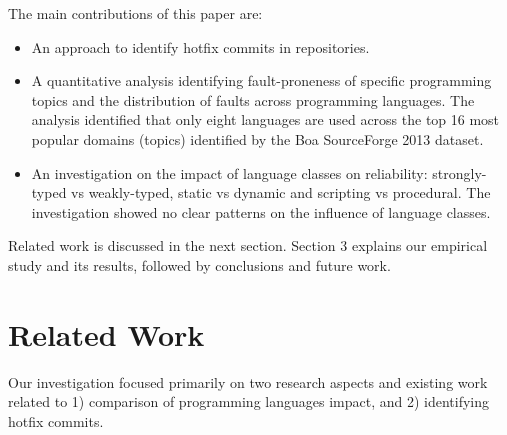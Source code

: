 \documentclass{sig-alternate}
\begin{document}
The main contributions of this paper are:
%
\begin{itemize}
  \item An  approach to identify hotfix commits in repositories.
  \item A quantitative analysis identifying fault-proneness of specific programming topics and the distribution of faults across programming languages. The analysis identified that only eight languages are used across the top 16 most popular domains (topics) identified by the Boa SourceForge 2013 dataset.
  \item An investigation on the impact of language classes on reliability: strongly-typed vs weakly-typed, static vs dynamic and scripting vs procedural. The investigation showed no clear patterns on the influence of language classes.
\end{itemize}
%
Related work is discussed in the next section. Section 3 explains our empirical study and its results, followed by conclusions and future work.

\section{Related Work}

Our investigation focused primarily on two research aspects and existing work related to 1) comparison of programming languages impact, and 2) identifying hotfix commits.


\end{document}
